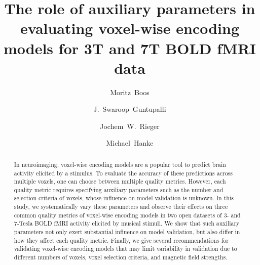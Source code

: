 
\newcommand{\beginsupplement}{%
        \setcounter{table}{0}
        \renewcommand{\thetable}{S\arabic{table}}%
        \setcounter{figure}{0}
        \renewcommand{\thefigure}{S\arabic{figure}}%
     }
\newcommand{\norm}[1]{\left\lVert #1 \right\rVert}
\usepackage{amsmath}

\usepackage[mathlines]{lineno}
\linenumbers
\usepackage{adjustbox}
\usepackage[natbibapa]{apacite}


\title{The role of auxiliary parameters in evaluating voxel-wise encoding models for 3T and 7T BOLD fMRI data}


\author[1]{Moritz~Boos}
\author[2]{J.~Swaroop~Guntupalli}
\author[1]{Jochem~W.~Rieger}
\author[3,4]{Michael~Hanke}

\maketitle

\begin{abstract}
In neuroimaging, voxel-wise encoding models are a popular tool to predict brain activity elicited by a stimulus.
To evaluate the accuracy of these predictions across multiple voxels, one can choose between multiple quality metrics.
However, each quality metric requires specifying auxiliary parameters such as the number and selection criteria of voxels, whose influence on model validation is unknown.
In this study, we systematically vary these parameters and observe their effects on three common quality metrics of voxel-wise encoding models in two open datasets of 3- and 7-Tesla BOLD fMRI activity elicited by musical stimuli.
We show that such auxiliary parameters not only exert substantial influence on model validation, but also differ in how they affect each quality metric.
Finally, we give several recommendations for validating voxel-wise encoding models that may limit variability in validation due to different numbers of voxels, voxel selection criteria, and magnetic field strengths.
\end{abstract}

